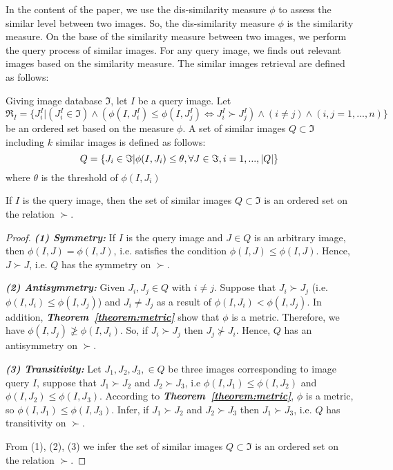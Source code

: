 \documentclass{amcs}
\begin{document}
In the content of the paper, we use the dis-similarity measure $\phi $ to assess the similar level between two images. So, the dis-similarity measure $\phi $ is the similarity measure. On the base of the similarity measure between two images, we perform the query process of similar images. For any query image, we finds out relevant images based on the similarity measure. The similar images retrieval are defined as follows:
\begin{definition}{} Giving image database $\Im $, let $I$ be a query image. Let ${\Re _I} = \{ J_i^I|(J_i^I \in \Im ) \wedge (\phi (I,J_i^I) \le \phi (I,J_j^I) \Leftrightarrow J_i^I \succ J_j^I) \wedge (i \ne j) \wedge (i,j = 1,...,n)\} $ be an ordered set based on the measure $\phi $. A set of similar images $Q \subset \Im $ including $k$ similar images is defined as follows:
\begin{equation}
Q = \{ {J_i} \in \Im |\phi (I,{J_i}) \le \theta ,{\rm{ }}\forall J \in \Im ,i = 1,...,|Q|\}
\end{equation}
where $\theta $ is the threshold of $\phi (I,{J_i})$
\end{definition}
\begin{theorem}{} If $I$ is the query image, then the set of similar images $Q \subset \Im $  is an ordered set on the relation $ \succ $.
\end{theorem}
\begin{proof}{}

\textit{\textbf{(1) Symmetry:}} If $I$ is the query image and $J \in Q$ is an arbitrary image, then $\phi (I,J) = \phi (I,J)$, i.e. satisﬁes the condition $\phi (I,J) \le \phi (I,J)$. Hence, $J \succ J$, i.e. $Q$ has the symmetry on $ \succ $.

\textit{\textbf{(2) Antisymmetry:}} Given ${J_i},{J_j} \in Q$ with $i \ne j$. Suppose that ${J_i} \succ {J_j}$ (i.e. $\phi (I,{J_i}) \le \phi (I,{J_j})$) and ${J_i} \ne {J_j}$ as a result of $\phi (I,{J_i}) < \phi (I,{J_j})$. In addition, \textbf{\textit{Theorem~\ref{theorem:metric}}} show that $\phi $ is a metric. Therefore, we have $\phi (I,{J_j}) \ngeq \phi (I,{J_i})$. So, if ${J_i} \succ {J_j}$ then ${J_j} \nsucc {J_i}$. Hence, $Q$ has an antisymmetry on $ \succ $.

\textit{\textbf{(3) Transitivity:}} Let ${J_1},{J_2},{J_3}, \in Q$ be three images corresponding to image query $I$, suppose that ${J_1} \succ {J_2}$ and ${J_2} \succ {J_3}$, i.e $\phi (I,{J_1}) \le \phi (I,{J_2})$ and $\phi (I,{J_2}) \le \phi (I,{J_3})$. According to \textit{\textbf{Theorem~\ref{theorem:metric}}}, $\phi $ is a metric, so $\phi (I,{J_1}) \le \phi (I,{J_3})$. Infer, if ${J_1} \succ {J_2}$ and ${J_2} \succ {J_3}$ then ${J_1} \succ {J_3}$, i.e. $Q$ has transitivity on  $ \succ $.

From (1), (2), (3) we infer the set of similar images $Q \subset \Im $ is an ordered set on the relation $ \succ $.
\end{proof}
\end{document}
